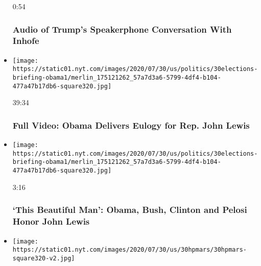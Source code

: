 \begin{itemize}
  0:54

  \hypertarget{audio-of-trumps-speakerphone-conversation-with-inhofe}{%
  \subsubsection{Audio of Trump's Speakerphone Conversation With
  Inhofe}\label{audio-of-trumps-speakerphone-conversation-with-inhofe}}
\item
  \href{https://www.nytimes.com/video/us/100000007264733/obama-john-lewis-funeral.html?action=click\&module=video-series-bar\&region=header\&pgtype=Article\&playlistId=video/latest-video}{}

  \texttt{[image: https://static01.nyt.com/images/2020/07/30/us/politics/30elections-briefing-obama1/merlin\_175121262\_57a7d3a6-5799-4df4-b104-477a47b17db6-square320.jpg]}

  39:34

  \hypertarget{full-video-obama-delivers-eulogy-for-rep-john-lewis}{%
  \subsubsection{Full Video: Obama Delivers Eulogy for Rep. John
  Lewis}\label{full-video-obama-delivers-eulogy-for-rep-john-lewis}}
\item
  \href{https://www.nytimes.com/video/us/politics/100000007264823/john-lewis-funeral.html?action=click\&module=video-series-bar\&region=header\&pgtype=Article\&playlistId=video/latest-video}{}

  \texttt{[image: https://static01.nyt.com/images/2020/07/30/us/politics/30elections-briefing-obama1/merlin\_175121262\_57a7d3a6-5799-4df4-b104-477a47b17db6-square320.jpg]}

  3:16

  \hypertarget{this-beautiful-man-obama-bush-clinton-and-pelosi-honor-john-lewis}{%
  \subsubsection{`This Beautiful Man': Obama, Bush, Clinton and Pelosi
  Honor John
  Lewis}\label{this-beautiful-man-obama-bush-clinton-and-pelosi-honor-john-lewis}}
\item
  \href{https://www.nytimes.com/video/us/100000007264604/nasas-perseverance-mars.html?action=click\&module=video-series-bar\&region=header\&pgtype=Article\&playlistId=video/latest-video}{}

  \texttt{[image: https://static01.nyt.com/images/2020/07/30/us/30hpmars/30hpmars-square320-v2.jpg]}


\end{itemize}
